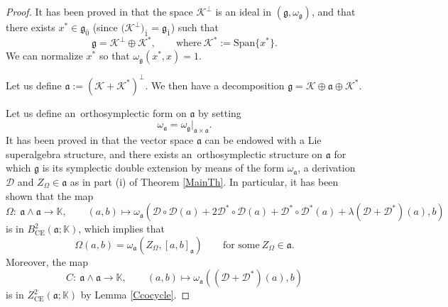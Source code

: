 \documentclass[pdftex]{sigma}
\numberwithin{equation}{section}
\begin{document}
\begin{proof}

It has been proved in \cite{BM} that the space $\mathscr{K}^\perp$ is an ideal in $(\mathfrak{g},\omega_\mathfrak{g})$, and that there exists $x^* \in \mathfrak{g}_{\bar 0}$ \big(since $\bigl(\mathscr{K}^\perp\bigr)_{\bar 1}=\mathfrak{g}_{\bar 1}$\big) such that
\[
\mathfrak{g}=\mathscr{K}^\perp\oplus \mathscr{K}^*, \qquad \text{where} \ \mathscr{K}^*:=\mathrm{Span}\{x^*\}.
\]
We can normalize $x^*$ so that $\omega_\mathfrak{g}(x^*,x)=1$.

Let us define $\mathfrak{a}:=(\mathscr{K} +\mathscr{K}^*)^\perp$. We then have a decomposition $\mathfrak{g}=\mathscr{K} \oplus \mathfrak{a} \oplus \mathscr{K}^*$.

Let us define an~orthosymplectic form on $\mathfrak{a}$ by setting
\[
\omega_\mathfrak{a}={\omega_\mathfrak{g}}\vert_{\mathfrak{a}\times \mathfrak{a}}.
\]
It has been proved in \cite{BM} that the vector space $\mathfrak{a}$ can be endowed with a Lie superalgebra structure, and there exists an~orthosymplectic structure on $\mathfrak{a}$ for which $\mathfrak{g}$ is its symplectic double extension by means of the form $\omega_\mathfrak{a}$, a derivation $\mathscr D$ and $Z_\Omega\in \mathfrak{a}$ as in part (i) of Theorem \ref{MainTh}. In particular, it has been shown that the map
\[
\Omega\colon\ \mathfrak{a}\wedge \mathfrak{a} \rightarrow \mathbb K, \qquad (a,b) \mapsto \omega_\mathfrak{a}( {\mathscr D} \circ {\mathscr D}(a) + 2 {\mathscr D}^* \circ {\mathscr D}(a)+ {\mathscr D}^* \circ {\mathscr D}^*(a) +\lambda ( {\mathscr D} + {\mathscr D} ^* )(a) , b)
\]
is in $B^2_{\text{CE}}(\mathfrak{a}; \mathbb K)$, which implies that
\begin{equation}\label{Omegatr}
\Omega(a,b)=\omega_\mathfrak{a}(Z_\Omega, [a,b]_\mathfrak{a}) \qquad \text{for some} \ Z_\Omega\in \mathfrak{a}.
\end{equation}
Moreover, the map
\[
C\colon\ \mathfrak{a}\wedge \mathfrak{a} \rightarrow \mathbb K, \qquad (a,b) \mapsto \omega_\mathfrak{a}(( {\mathscr D} + {\mathscr D}^*)(a) , b)
\]
is in $Z_{\mathrm{CE}}^2(\mathfrak{a}; \mathbb K)$ by Lemma \ref{Ccocycle}.


\end{proof}
\end{document}
